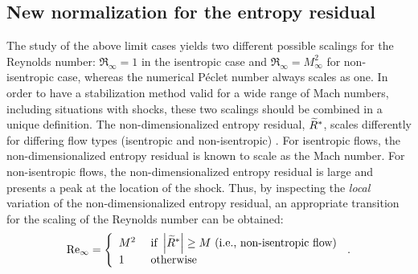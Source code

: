 \subsection{New normalization for the entropy residual} \label{sec:new_normaliz}

The study of the above limit cases yields two different possible scalings for the Reynolds number: $\Re_\infty = 1$ in the isentropic case and $\Re_\infty  = M_\infty^2$ for non-isentropic case, whereas the numerical P\'eclet number always scales as one. In order to have a stabilization method valid for a wide range of Mach numbers, including situations with shocks, these two scalings should be combined in a unique definition. The non-dimensionalized entropy residual, $\widetilde{R}^*$, scales differently for differing flow types (isentropic and non-isentropic) \cite{alazard}. For isentropic flows, the non-dimensionalized entropy residual is known to scale as the Mach number. For non-isentropic flows, the non-dimensionalized entropy residual is large and presents a peak at the location of the shock. Thus, by inspecting the  \emph{local} variation of the non-dimensionalized entropy residual, an appropriate transition for the scaling of the Reynolds number can be obtained:
\begin{equation}  
\label{eq:norm_ent}
\textrm{Re}_\infty =  \left\{
\begin{array}{ll}
M^2  & \text{ if } \left| \widetilde{R}^* \right| \geq M \text{ (i.e., non-isentropic flow)} \\
1    & \text{ otherwise}
\end{array}
\right.
\, .
\end{equation}

